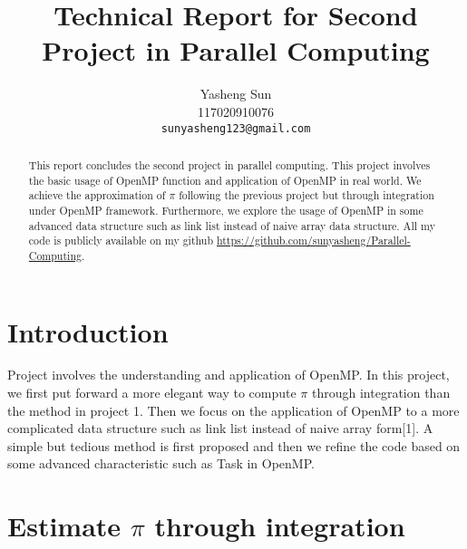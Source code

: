 \documentclass[10pt,twocolumn,letterpaper]{article}
\begin{document}
    
    \title{Technical Report for Second Project in Parallel Computing}
    
    \author{Yasheng Sun\\
    117020910076\\
    {\tt\small sunyasheng123@gmail.com}
    }
    
    \maketitle
    
    \begin{abstract}
       This report concludes the second project in parallel computing. 
       This project involves the basic usage of OpenMP function and 
       application of OpenMP in real world. We achieve the 
       approximation of $\pi$ following the previous project but through
       integration under OpenMP framework. Furthermore, we explore the
       usage of OpenMP in some advanced data structure such as link
       list instead of naive array data structure. All my code is publicly available on my github 
       \url{https://github.com/sunyasheng/Parallel-Computing}.

    \end{abstract}
    
    \section{Introduction}
    Project involves the understanding and application of OpenMP. In this project, we first put
    forward a more elegant way to compute $\pi$ through integration than the method in project 1. 
    Then we focus on the application of OpenMP to a more complicated data structure such as link list
    instead of naive array form[1]. A simple but tedious method is first proposed and then we refine 
    the code based on some advanced characteristic such as Task in OpenMP.
    
    \section{Estimate $\pi$ through integration}
\end{document}
